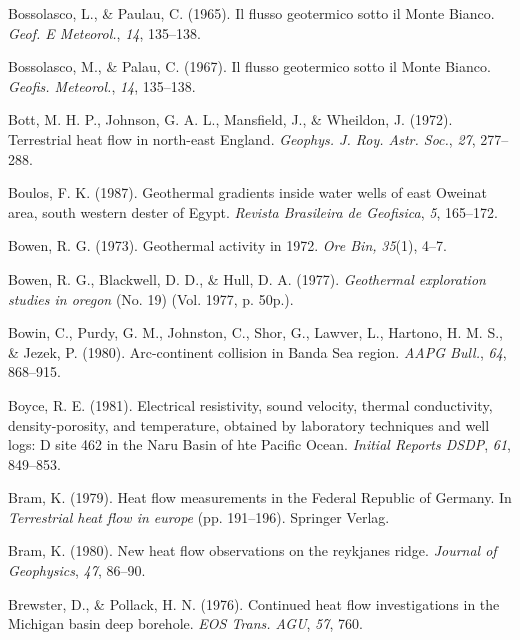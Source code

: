 \begin{CSLReferences}{1}{1}
\leavevmode{}%
Bossolasco, L., \& Paulau, C. (1965). Il flusso geotermico sotto il {Monte Bianco}. \emph{Geof. E Meteorol.}, \emph{14}, 135--138.

\leavevmode{}%
Bossolasco, M., \& Palau, C. (1967). Il flusso geotermico sotto il {Monte Bianco}. \emph{Geofis. Meteorol.}, \emph{14}, 135--138.

\leavevmode{}%
Bott, M. H. P., Johnson, G. A. L., Mansfield, J., \& Wheildon, J. (1972). Terrestrial heat flow in north-east {England}. \emph{Geophys. J. Roy. Astr. Soc.}, \emph{27}, 277--288.

\leavevmode{}%
Boulos, F. K. (1987). Geothermal gradients inside water wells of east {Oweinat} area, south western dester of {Egypt}. \emph{Revista Brasileira de Geofisica}, \emph{5}, 165--172.

\leavevmode{}%
Bowen, R. G. (1973). Geothermal activity in 1972. \emph{Ore Bin,} \emph{35}(1), 4--7.

\leavevmode{}%
Bowen, R. G., Blackwell, D. D., \& Hull, D. A. (1977). \emph{Geothermal exploration studies in oregon} (No. 19) (Vol. 1977, p. 50p.).

\leavevmode{}%
Bowin, C., Purdy, G. M., Johnston, C., Shor, G., Lawver, L., Hartono, H. M. S., \& Jezek, P. (1980). Arc-continent collision in {Banda Sea} region. \emph{AAPG Bull.}, \emph{64}, 868--915.

\leavevmode{}%
Boyce, R. E. (1981). Electrical resistivity, sound velocity, thermal conductivity, density-porosity, and temperature, obtained by laboratory techniques and well logs: D site 462 in the {Naru Basin of hte Pacific Ocean}. \emph{Initial Reports DSDP}, \emph{61}, 849--853.

\leavevmode{}%
Bram, K. (1979). Heat flow measurements in the {Federal Republic of Germany}. In \emph{Terrestrial heat flow in europe} (pp. 191--196). Springer Verlag.

\leavevmode{}%
Bram, K. (1980). New heat flow observations on the reykjanes ridge. \emph{Journal of Geophysics}, \emph{47}, 86--90.

\leavevmode{}%
Brewster, D., \& Pollack, H. N. (1976). Continued heat flow investigations in the {Michigan} basin deep borehole. \emph{EOS Trans. AGU}, \emph{57}, 760.


\end{CSLReferences}
